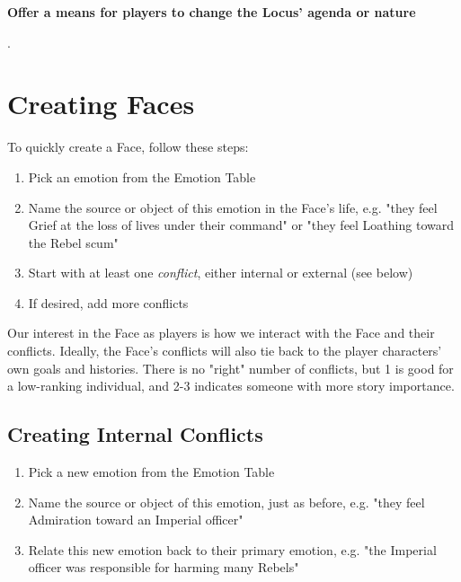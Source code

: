 \documentclass[10pt,oneside,letterpaper,landscape]{memoir}
\begin{document}
\begin{multicols}{3}
\textbf{Offer a means for players to change the Locus' agenda or nature}

\vfill\null %

\columnbreak

{\color{white}.}
\vspace{19mm}

\section{Creating Faces}

To quickly create a Face, follow these steps:

\begin{enumerate}
\item Pick an emotion from the Emotion Table
\item Name the source or object of this emotion in the Face's life, e.g. "they feel Grief at the loss of lives under their command" or "they feel Loathing toward the Rebel scum"
\item Start with at least one \textit{conflict}, either internal or external (see below)
\item If desired, add more conflicts
\end{enumerate}

Our interest in the Face as players is how we interact with the Face and their conflicts. Ideally, the Face’s conflicts will also tie back to the player characters' own goals and histories. There is no "right" number of conflicts, but 1 is good for a low-ranking individual, and 2-3 indicates someone with more story importance.

\subsection{Creating Internal Conflicts}

\begin{enumerate}
\item Pick a new emotion from the Emotion Table
\item Name the source or object of this emotion, just as before, e.g. "they feel Admiration toward an Imperial officer"
\item Relate this new emotion back to their primary emotion, e.g. "the Imperial officer was responsible for harming many Rebels"
\end{enumerate}


\end{multicols}
\end{document}
